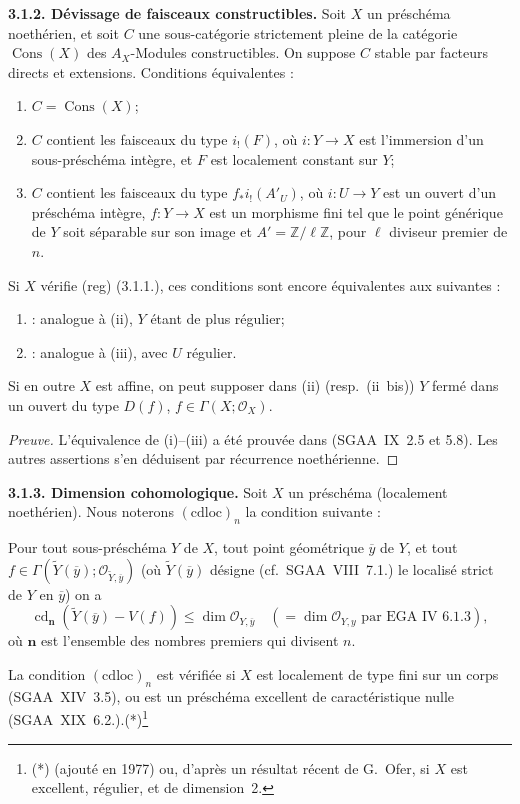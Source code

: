 \documentclass[11pt]{article}
\providecommand{\cO}{\mathcal{O}}
\providecommand{\wt}[1]{\widetilde{#1}}
\providecommand{\Cons}{\operatorname{Cons}}
\DeclareMathOperator{\cd}{cd}
\newcommand{\Z}{\mathbb{Z}}
\newcommand{\ol}[1]{\overline{#1}}
\begin{document}
\textbf{3.1.2. Dévissage de faisceaux constructibles.} Soit $X$ un préschéma noethérien, et soit $C$ une sous-catégorie strictement pleine de la catégorie $\Cons(X)$ des $A_X$-Modules constructibles. On suppose $C$ stable par facteurs directs et extensions. Conditions équivalentes :
\begin{enumerate}
\item[(i)] $C = \Cons(X)$;
\item[(ii)] $C$ contient les faisceaux du type $i_{!}(F)$, où $i : Y \to X$ est l'immersion d'un sous-préschéma intègre, et $F$ est localement constant sur $Y$;
\item[(iii)] $C$ contient les faisceaux du type $f_{*}i_{!}(A'_U)$, où $i : U \to Y$ est un ouvert d'un préschéma intègre, $f : Y \to X$ est un morphisme fini tel que le point générique de $Y$ soit séparable sur son image et $A' = \Z/\ell\Z$, pour $\ell$ diviseur premier de $n$.
\end{enumerate}
Si $X$ vérifie (reg) (3.1.1.), ces conditions sont encore équivalentes aux suivantes :
\begin{enumerate}
\item[(ii~bis)] : analogue à (ii), $Y$ étant de plus régulier;
\item[(iii~bis)] : analogue à (iii), avec $U$ régulier.
\end{enumerate}
Si en outre $X$ est affine, on peut supposer dans (ii) (resp.~(ii~bis)) $Y$ fermé dans un ouvert du type $D(f)$, $f \in \Gamma(X; \cO_X)$.

\begin{proof}[Preuve]
L'équivalence de (i)--(iii) a été prouvée dans (SGAA~IX~2.5 et 5.8). Les autres assertions s'en déduisent par récurrence noethérienne.
\end{proof}

\textbf{3.1.3. Dimension cohomologique.} Soit $X$ un préschéma (localement noethérien). Nous noterons $(\mathrm{cdloc})_n$ la condition suivante :

Pour tout sous-préschéma $Y$ de $X$, tout point géométrique $\ol{y}$ de $Y$, et tout $f \in \Gamma(\wt{Y}(\ol{y}); \cO_{\wt{Y},\ol{y}})$ (où $\wt{Y}(\ol{y})$ désigne (cf.~SGAA~VIII~7.1.) le localisé strict de $Y$ en $\ol{y}$) on a
\[
\cd_{\mathbf{n}}(\wt{Y}(\ol{y}) - V(f)) \leqslant \dim \cO_{Y,\ol{y}} \quad (= \dim \cO_{Y,y} \text{ par EGA~IV~6.1.3}),
\]
où $\mathbf{n}$ est l'ensemble des nombres premiers qui divisent $n$.

La condition $(\mathrm{cdloc})_n$ est vérifiée si $X$ est localement de type fini sur un corps (SGAA~XIV~3.5), ou est un préschéma excellent de caractéristique nulle (SGAA~XIX~6.2.).(*)\footnote{(*) (ajouté en 1977) ou, d'après un résultat récent de G.~Ofer, si $X$ est excellent, régulier, et de dimension~2.}
\end{document}
